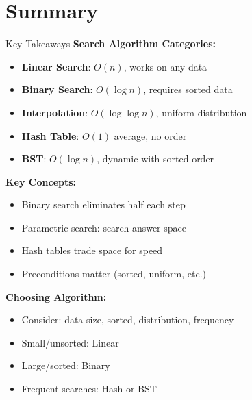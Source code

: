 \documentclass[aspectratio=169]{beamer}
\begin{document}
\section{Summary}

\begin{frame}{Key Takeaways}
  \textbf{Search Algorithm Categories:}
  \begin{itemize}
    \item \textbf{Linear Search}: $O(n)$, works on any data
    \item \textbf{Binary Search}: $O(\log n)$, requires sorted data
    \item \textbf{Interpolation}: $O(\log \log n)$, uniform distribution
    \item \textbf{Hash Table}: $O(1)$ average, no order
    \item \textbf{BST}: $O(\log n)$, dynamic with sorted order
  \end{itemize}

  \vspace{0.3cm}
  \textbf{Key Concepts:}
  \begin{itemize}
    \item Binary search eliminates half each step
    \item Parametric search: search answer space
    \item Hash tables trade space for speed
    \item Preconditions matter (sorted, uniform, etc.)
  \end{itemize}

  \vspace{0.3cm}
  \textbf{Choosing Algorithm:}
  \begin{itemize}
    \item Consider: data size, sorted, distribution, frequency
    \item Small/unsorted: Linear
    \item Large/sorted: Binary
    \item Frequent searches: Hash or BST
  \end{itemize}
\end{frame}
\end{document}
